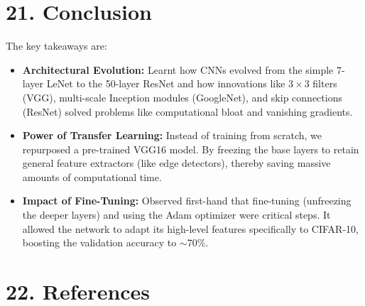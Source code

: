 \documentclass[11pt]{article}
\begin{document}
\section*{21. Conclusion}

The key takeaways are:

\begin{itemize}
\item \vspace{0.2cm}\textbf{Architectural Evolution:} Learnt how CNNs evolved from the simple 7-layer LeNet to the 50-layer ResNet and how innovations like $3\times3$ filters (VGG), multi-scale Inception modules (GoogleNet), and skip connections (ResNet) solved problems like computational bloat and vanishing gradients.
\item \textbf{Power of Transfer Learning:} Instead of training from scratch, we repurposed a pre-trained VGG16 model. By freezing the base layers to retain general feature extractors (like edge detectors), thereby saving massive amounts of computational time.
\item \textbf{Impact of Fine-Tuning:} Observed first-hand that fine-tuning (unfreezing the deeper layers) and using the Adam optimizer were critical steps. It allowed the network to adapt its high-level features specifically to CIFAR-10, boosting the validation accuracy to $\sim$70\%.
\end{itemize}


\section*{22. References}
\end{document}
